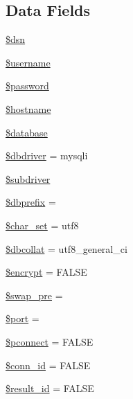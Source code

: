 \subsection*{Data Fields}
\begin{DoxyCompactItemize}
\item 
\hyperlink{class_c_i___d_b__driver_a6441cca8c9fa11e16d2017e8cb733c10}{\$dsn}
\item 
\hyperlink{class_c_i___d_b__driver_a0eb82aa5f81cf845de4b36cd653c42cf}{\$username}
\item 
\hyperlink{class_c_i___d_b__driver_a607686ef9f99ea7c42f4f3dd3dbb2b0d}{\$password}
\item 
\hyperlink{class_c_i___d_b__driver_a8bf9ffb42ed554b203b55377d1fc9aa4}{\$hostname}
\item 
\hyperlink{class_c_i___d_b__driver_a7691c0162d89de0b6ba47edcd8ba8878}{\$database}
\item 
\hyperlink{class_c_i___d_b__driver_a0cde2a16322a023d040aa7f725877597}{\$dbdriver} = \textquotesingle{}mysqli\textquotesingle{}
\item 
\hyperlink{class_c_i___d_b__driver_a1322ca756348b11d080cb7a4f590de15}{\$subdriver}
\item 
\hyperlink{class_c_i___d_b__driver_a81398da65aef92236c2bc2e0307f1fa4}{\$dbprefix} = \textquotesingle{}\textquotesingle{}
\item 
\hyperlink{class_c_i___d_b__driver_a0ea660eb249174aefdc2c35238fb1dc8}{\$char\+\_\+set} = \textquotesingle{}utf8\textquotesingle{}
\item 
\hyperlink{class_c_i___d_b__driver_a303eb205131e0266c2a57bcc6a34e80a}{\$dbcollat} = \textquotesingle{}utf8\+\_\+general\+\_\+ci\textquotesingle{}
\item 
\hyperlink{class_c_i___d_b__driver_a1e32803d860e58570971345dddd14d8e}{\$encrypt} = F\+A\+L\+S\+E
\item 
\hyperlink{class_c_i___d_b__driver_a913c5a5af0c805fe64f884af6028fb73}{\$swap\+\_\+pre} = \textquotesingle{}\textquotesingle{}
\item 
\hyperlink{class_c_i___d_b__driver_aa0787efab4b22e8a212882f3409d4c77}{\$port} = \textquotesingle{}\textquotesingle{}
\item 
\hyperlink{class_c_i___d_b__driver_a5b7c010f6dfe8dfd41ce86fdaed67ebf}{\$pconnect} = F\+A\+L\+S\+E
\item 
\hyperlink{class_c_i___d_b__driver_a16c23f1dcbfed2f2759f5e54f604106d}{\$conn\+\_\+id} = F\+A\+L\+S\+E
\item 
\hyperlink{class_c_i___d_b__driver_a0ebacb40e3b6f8bf33d3de0f2cc71474}{\$result\+\_\+id} = F\+A\+L\+S\+E

\end{DoxyCompactItemize}
